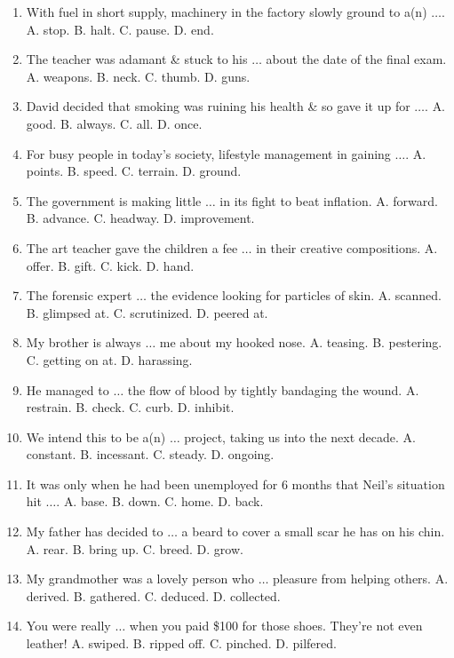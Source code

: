 \documentclass{article}
\numberwithin{equation}{section}
\begin{document}
\begin{enumerate}[leftmargin=2mm]
	\item With fuel in short supply, machinery in the factory slowly ground to a(n) $\ldots$. {\sf A.} stop. {\sf B.} halt. {\sf C.} pause. {\sf D.} end.
	\item The teacher was adamant \& stuck to his $\ldots$ about the date of the final exam. {\sf A.} weapons. {\sf B.} neck. {\sf C.} thumb. {\sf D.} guns.
	\item David decided that smoking was ruining his health \& so gave it up for $\ldots$. {\sf A.} good. {\sf B.} always. {\sf C.} all. {\sf D.} once.
	\item For busy people in today's society, lifestyle management in gaining $\ldots$. {\sf A.} points. {\sf B.} speed. {\sf C.} terrain. {\sf D.} ground.
	\item The government is making little $\ldots$ in its fight to beat inflation. {\sf A.} forward. {\sf B.} advance. {\sf C.} headway. {\sf D.} improvement.
	\item The art teacher gave the children a fee $\ldots$ in their creative compositions. {\sf A.} offer. {\sf B.} gift. {\sf C.} kick. {\sf D.} hand.
	\item The forensic expert $\ldots$ the evidence looking for particles of skin. {\sf A.} scanned. {\sf B.} glimpsed at. {\sf C.} scrutinized. {\sf D.} peered at.
	\item My brother is always $\ldots$ me about my hooked nose. {\sf A.} teasing. {\sf B.} pestering. {\sf C.} getting on at. {\sf D.} harassing.
	\item He managed to $\ldots$ the flow of blood by tightly bandaging the wound. {\sf A.} restrain. {\sf B.} check. {\sf C.} curb. {\sf D.} inhibit.
	\item We intend this to be a(n) $\ldots$ project, taking us into the next decade. {\sf A.} constant. {\sf B.} incessant. {\sf C.} steady. {\sf D.} ongoing.
	\item It was only when he had been unemployed for 6 months that Neil's situation hit $\ldots$. {\sf A.} base. {\sf B.} down. {\sf C.} home. {\sf D.} back.
	\item My father has decided to $\ldots$ a beard to cover a small scar he has on his chin. {\sf A.} rear. {\sf B.} bring up. {\sf C.} breed. {\sf D.} grow.
	\item My grandmother was a lovely person who $\ldots$ pleasure from helping others. {\sf A.} derived. {\sf B.} gathered. {\sf C.} deduced. {\sf D.} collected.
	\item You were really $\ldots$ when you paid \$100 for those shoes. They're not even leather! {\sf A.} swiped. {\sf B.} ripped off. {\sf C.} pinched. {\sf D.} pilfered.

\end{enumerate}
\end{document}
